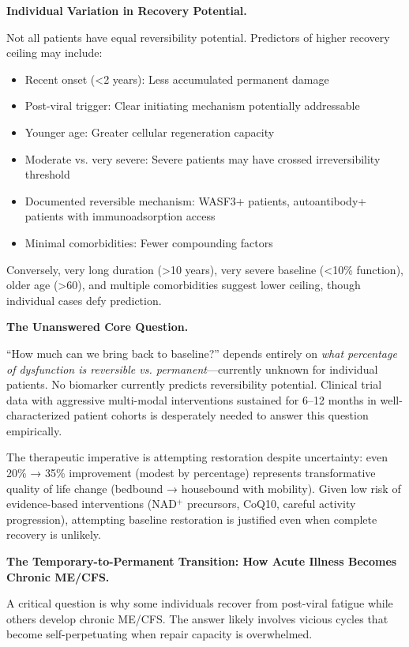 \textbf{Individual Variation in Recovery Potential.}

Not all patients have equal reversibility potential. Predictors of higher recovery ceiling may include:

\begin{itemize}
    \item Recent onset (<2 years): Less accumulated permanent damage
    \item Post-viral trigger: Clear initiating mechanism potentially addressable
    \item Younger age: Greater cellular regeneration capacity
    \item Moderate vs. very severe: Severe patients may have crossed irreversibility threshold
    \item Documented reversible mechanism: WASF3+ patients, autoantibody+ patients with immunoadsorption access
    \item Minimal comorbidities: Fewer compounding factors
\end{itemize}

Conversely, very long duration (>10 years), very severe baseline (<10\% function), older age (>60), and multiple comorbidities suggest lower ceiling, though individual cases defy prediction.

\textbf{The Unanswered Core Question.}

``How much can we bring back to baseline?'' depends entirely on \textit{what percentage of dysfunction is reversible vs. permanent}---currently unknown for individual patients. No biomarker currently predicts reversibility potential. Clinical trial data with aggressive multi-modal interventions sustained for 6--12 months in well-characterized patient cohorts is desperately needed to answer this question empirically.

The therapeutic imperative is attempting restoration despite uncertainty: even 20\% → 35\% improvement (modest by percentage) represents transformative quality of life change (bedbound → housebound with mobility). Given low risk of evidence-based interventions (NAD$^+$ precursors, CoQ10, careful activity progression), attempting baseline restoration is justified even when complete recovery is unlikely.

\textbf{The Temporary-to-Permanent Transition: How Acute Illness Becomes Chronic ME/CFS.}

A critical question is why some individuals recover from post-viral fatigue while others develop chronic ME/CFS. The answer likely involves vicious cycles that become self-perpetuating when repair capacity is overwhelmed.

